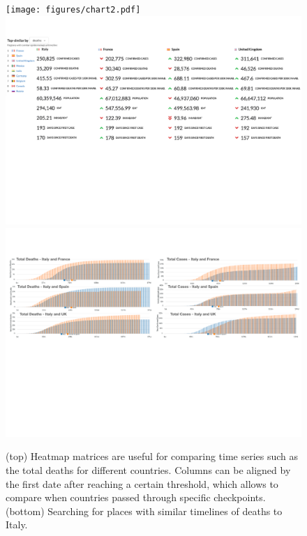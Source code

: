 \documentclass[10pt,journal,compsoc]{IEEEtran}
\begin{document}
\begin{figure}
	\texttt{[image: figures/chart2.pdf]}
	\includegraphics[width=\textwidth]{figures/similarity1.pdf}
	\includegraphics[width=\textwidth]{figures/similarity2.pdf}
	\caption{(top) Heatmap matrices are useful for comparing time series such as the total deaths for different countries. Columns can be aligned by the first date after reaching a certain threshold, which allows to compare when countries passed through specific checkpoints. (bottom) Searching for places with similar timelines of deaths to Italy.}
	\label{fig:covid19-tool}
\end{figure}
\end{document}
